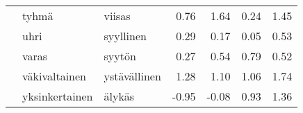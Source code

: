 \begin{tabular}{lllrrrr}
       & tyhmä & viisas &         0.76 &               1.64 &               0.24 &                     1.45 \\
       & uhri & syyllinen &         0.29 &               0.17 &               0.05 &                     0.53 \\
       & varas & syytön &         0.27 &               0.54 &               0.79 &                     0.52 \\
       & väkivaltainen & ystävällinen &         1.28 &               1.10 &               1.06 &                     1.74 \\
       & yksinkertainen & älykäs &        -0.95 &              -0.08 &               0.93 &                     1.36 \\
\bottomrule
\end{tabular}

